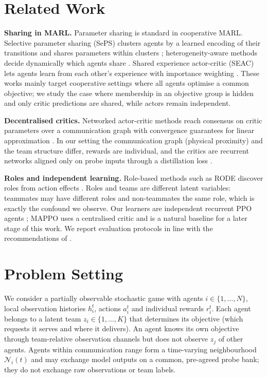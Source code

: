 \documentclass{article}
\begin{document}
\section{Related Work}
\textbf{Sharing in MARL.} Parameter sharing is standard in cooperative MARL. Selective parameter sharing (SePS)
clusters agents by a learned encoding of their transitions and shares parameters within clusters
\cite{christianos2021seps}; heterogeneity-aware methods decide dynamically which agents share
\cite{hu2025heterogeneity}. Shared experience actor-critic (SEAC) lets agents learn from each other's experience
with importance weighting \cite{christianos2020seac}. These works mainly target cooperative settings where all
agents optimise a common objective; we study the case where membership in an objective group is hidden and
only critic predictions are shared, while actors remain independent.

\textbf{Decentralised critics.} Networked actor-critic methods reach consensus on critic parameters over a
communication graph with convergence guarantees for linear approximation \cite{zhang2018networked}. In our setting
the communication graph (physical proximity) and the team structure differ, rewards are individual, and the
critics are recurrent networks aligned only on probe inputs through a distillation loss \cite{rusu2016policy}.

\textbf{Roles and independent learning.} Role-based methods such as RODE discover roles from action effects
\cite{wang2021rode}. Roles and teams are different latent variables: teammates may have different roles and
non-teammates the same role, which is exactly the confound we observe. Our learners are independent recurrent PPO
agents \cite{schulman2017ppo,dewitt2020ippo}; MAPPO \cite{yu2022mappo} uses a centralised critic and is a natural
baseline for a later stage of this work. We report evaluation protocols in line with the recommendations of
\cite{agarwal2021precipice}.

\section{Problem Setting}
We consider a partially observable stochastic game with agents $i\in\{1,\dots,N\}$, local observation histories
$h_i^t$, actions $a_i^t$ and individual rewards $r_i^t$. Each agent belongs to a latent team $z_i\in\{1,\dots,K\}$
that determines its objective (which requests it serves and where it delivers). An agent knows its own objective
through team-relative observation channels but does not observe $z_j$ of other agents. Agents within
communication range form a time-varying neighbourhood $\mathcal{N}_i(t)$ and may exchange model outputs on a
common, pre-agreed probe bank; they do not exchange raw observations or team labels.
\end{document}
